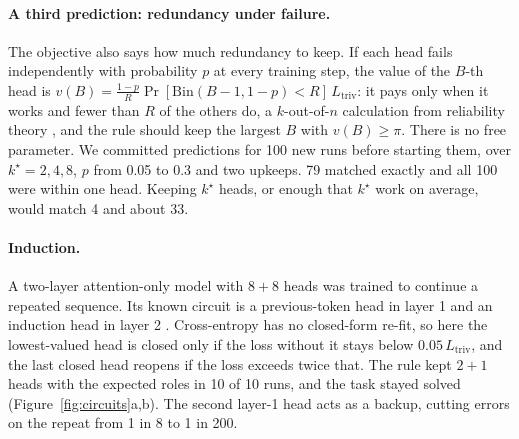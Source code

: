 \documentclass[letterpaper]{article} %
\newcommand{\Ltriv}{L_{\mathrm{triv}}}
\newcommand{\kstar}{k^\star}
\begin{document}
\paragraph{A third prediction: redundancy under failure.} The objective also says how much redundancy to keep. If each head fails independently with probability $p$ at every training step, the value of the $B$-th head is $v(B)=\frac{1-p}{R}\Pr[\mathrm{Bin}(B-1,1-p)<R]\,\Ltriv$: it pays only when it works and fewer than $R$ of the others do, a $k$-out-of-$n$ calculation from reliability theory \citep{barlow1965reliability}, and the rule should keep the largest $B$ with $v(B)\ge\pi$. There is no free parameter. We committed predictions for 100 new runs before starting them, over $\kstar=2,4,8$, $p$ from 0.05 to 0.3 and two upkeeps. 79 matched exactly and all 100 were within one head. Keeping $\kstar$ heads, or enough that $\kstar$ work on average, would match 4 and about 33.


\paragraph{Induction.} A two-layer attention-only model with $8+8$ heads was trained to continue a repeated sequence. Its known circuit is a previous-token head in layer 1 and an induction head in layer 2 \citep{olsson2022}. Cross-entropy has no closed-form re-fit, so here the lowest-valued head is closed only if the loss without it stays below $0.05\,\Ltriv$, and the last closed head reopens if the loss exceeds twice that. The rule kept $2+1$ heads with the expected roles in 10 of 10 runs, and the task stayed solved (Figure~\ref{fig:circuits}a,b). The second layer-1 head acts as a backup, cutting errors on the repeat from 1 in 8 to 1 in 200.
\end{document}
